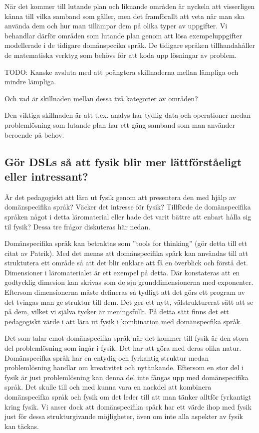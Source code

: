 \begin{binge}
När det kommer till lutande plan och liknande områden är nyckeln att visserligen känna till vilka samband som gäller, men det framförallt att veta när man ska använda dem och hur man tillämpar dem på olika typer av uppgifter. Vi behandlar därför områden som lutande plan genom att lösa exempeluppgifter modellerade i de tidigare domänspecika språk. De tidigare språken tillhandahåller de matematiska verktyg som behövs för att koda upp lösningar av problem.


TODO: Kanske avsluta med att poängtera skillnaderna mellan lämpliga och mindre lämpliga.

Och vad är skillnaden mellan dessa två kategorier av områden?

Den viktiga skillnaden är att t.ex. analys har tydlig data och operationer
medan problemlösning som lutande plan har ett gäng samband som man använder
beroende på behov.

\subsection{Gör DSLs så att fysik blir mer lättförståeligt eller intressant?}
\label{sec:bara_fysik}

Är det pedagogiskt att lära ut fysik genom att presentera den med hjälp av domänspecifika språk? Väcker det intresse för fysik? Tillförde de domänspecifika språken något i detta läromaterial eller hade det varit bättre att enbart hålla sig til fysik? Dessa tre frågor diskuteras här nedan.

Domänspecifika språk kan betraktas som ''tools for thinking'' (gör detta till ett citat av Patrik). Med det menas att domänspecifika spårk kan användas till att struktutera ett område så att det blir enklare att få en överblick och förstå det. Dimensioner i läromaterialet är ett exempel på detta. Där konstateras att en godtycklig dimesion kan skrivas som de sju grunddimensionerna med exponenter. Eftersom dimensionerna måste defineras så tydligt att det görs ett program av det tvingas man ge struktur till dem. Det ger ett nytt, välstrukturerat sätt att se på dem, vilket vi själva tycker är meningsfullt. På detta sätt finns det ett pedagogiskt värde i att lära ut fysik i kombination med domänspecfika språk.

Det som talar emot domänspecifka språk när det kommer till fysik är den stora del problemlösning som ingår i fysik. Det har att göra med deras olika natur. Domänspecifka språk har en entydig och fyrkantig struktur medan problemlösning handlar om kreativitet och nytänkande. Eftersom en stor del i fysik är just problemlösning kan denna del inte fångas upp med domänspecifika språk. Det skulle till och med kunna vara en nackdel att kombinera domänspecifka språk och fysik om det leder till att man tänker alltför fyrkantigt kring fysik. Vi anser dock att domänspecifika spårk har ett värde ihop med fysik just för dessa strukturgivande möjligheter, även om inte alla aspekter av fysik kan täckas.


\end{binge}
